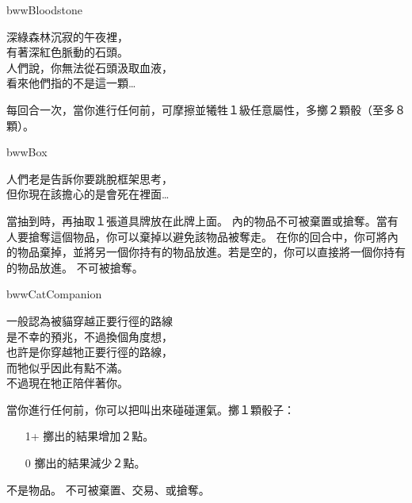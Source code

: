 %
\begin{OmenCard}{bww}{Bloodstone}{}
  \begin{CardStory}
    深綠森林沉寂的午夜裡，\\
    有著深紅色脈動的石頭。\\
    人們說，你無法從石頭汲取血液，\\
    看來他們指的不是這一顆…
  \end{CardStory}
  每回合一次，當你進行任何前，可摩擦\ThisName{}並犧牲１級任意屬性，多擲２顆骰（至多８顆）。\smallbreak
\end{OmenCard}%
\linebreak[0]%
\begin{OmenCard}{bww}{Box}{}
  \begin{CardStory}
    人們老是告訴你要跳脫框架思考，\\
    但你現在該擔心的是會死在裡面…
  \end{CardStory}
  當抽到\ThisName{}時，再抽取１張道具牌放在此牌上面。\smallbreak
  \ThisName{}內的物品不可被棄置或搶奪。當有人要搶奪這個物品，你可以棄掉\ThisName{}以避免該物品被奪走。\smallbreak
  在你的回合中，你可將\ThisName{}內的物品棄掉，並將另一個你持有的物品放進\ThisName{}。若\ThisName{}是空的，你可以直接將一個你持有的物品放進\ThisName{}。\smallbreak
  \ThisName{}不可被搶奪。\smallbreak
\end{OmenCard}%
\linebreak[0]%
\begin{OmenCard}{bww}{Cat}{Companion}
  \begin{CardStory}
    一般認為被貓穿越正要行徑的路線\\
    是不幸的預兆，不過換個角度想，\\
    也許是你穿越牠正要行徑的路線，\\
    而牠似乎因此有點不滿。\\
    不過現在牠正陪伴著你。
  \end{CardStory}
  當你進行任何前，你可以把\ThisName{}叫出來碰碰運氣。擲１顆骰子：
  \begin{itemize}
    \item[1+] 擲出的結果增加２點。
    \item[0] 擲出的結果減少２點。
  \end{itemize}
  \ThisName{}不是物品。\smallbreak
  \ThisName{}不可被棄置、交易、或搶奪。\smallbreak
\end{OmenCard}%
\linebreak[0]%
